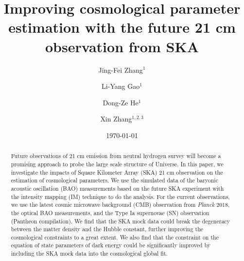 \documentclass[aps,prd,amsmath,amssymb,showpacs,floats,floatfix,nofootinbib,reprint]{revtex4-1}
\begin{document}

\title{Improving cosmological parameter estimation with the future 21 cm observation from SKA }
\author{Jing-Fei Zhang$^1$}
\author{Li-Yang Gao$^1$}
\author{Dong-Ze He$^1$}
\author{Xin Zhang$^{1,2,3}$}%
\date{\today}


\begin{abstract}
Future observations of 21 cm emission from neutral hydrogen survey will become a promising approach to probe the large scale structure of Universe.
In this paper, we investigate the impacts of Square Kilometer Array (SKA) 21 cm observation on the estimation of cosmological parameters.
We use the simulated data of the baryonic acoustic oscillation (BAO) measurements based on the future SKA experiment with the intensity mapping (IM) technique to do the analysis. For the current observations, we use the latest cosmic microwave background (CMB) observation from {\it Planck} 2018, the optical BAO measurements, and the Type Ia supernovae (SN) observation (Pantheon compilation). 
We find that the SKA mock data could break the degeneracy between the matter density and the Hubble constant, further improving the cosmological constraints to a great extent. 
We also find that the constraint on the equation of state parameters of dark energy could be significantly improved by including the SKA mock data into the cosmological global fit.

\end{abstract}

\maketitle
\end{document}
